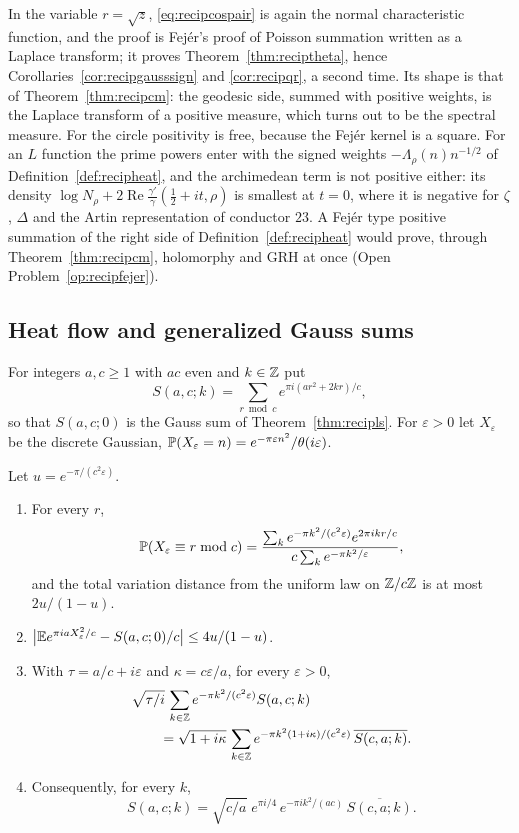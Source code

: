 In the variable $r=\sqrt z$, \eqref{eq:recipcospair} is again the normal characteristic function, and the proof is Fej\'er's proof of Poisson summation written as a Laplace transform; it proves Theorem~\ref{thm:reciptheta}, hence Corollaries~\ref{cor:recipgausssign} and \ref{cor:recipqr}, a second time. Its shape is that of Theorem~\ref{thm:recipcm}: the geodesic side, summed with positive weights, is the Laplace transform of a positive measure, which turns out to be the spectral measure. For the circle positivity is free, because the Fej\'er kernel is a square. For an $L$ function the prime powers enter with the signed weights $-\Lambda_\rho(n)n^{-1/2}$ of Definition~\ref{def:recipheat}, and the archimedean term is not positive either: its density $\log N_\rho+2\operatorname{Re}\frac{\gamma'}{\gamma}(\frac12+it,\rho)$ is smallest at $t=0$, where it is negative for $\zeta$, $\Delta$ and the Artin representation of conductor $23$. A Fej\'er type positive summation of the right side of Definition~\ref{def:recipheat} would prove, through Theorem~\ref{thm:recipcm}, holomorphy and GRH at once (Open Problem~\ref{op:recipfejer}).

\subsection{Heat flow and generalized Gauss sums}

For integers $a,c\ge1$ with $ac$ even and $k\in\mathbb{Z}$ put
\[
S(a,c;k)=\sum_{r\bmod c}e^{\pi i(ar^2+2kr)/c},
\]
so that $S(a,c;0)$ is the Gauss sum of Theorem~\ref{thm:recipls}. For $\varepsilon>0$ let $X_\varepsilon$ be the discrete Gaussian, $\mathbb{P}(X_\varepsilon=n)=e^{-\pi\varepsilon n^2}/\theta(i\varepsilon)$.

\begin{theorem}\label{thm:recipheat}
Let $u=e^{-\pi/(c^2\varepsilon)}$.
\begin{enumerate}
\item[(i)] For every $r$,
\[
\mathbb{P}(X_\varepsilon\equiv r\bmod c)=\frac{\sum_ke^{-\pi k^2/(c^2\varepsilon)}e^{2\pi ikr/c}}{c\sum_ke^{-\pi k^2/\varepsilon}},
\]
and the total variation distance from the uniform law on $\mathbb{Z}/c\mathbb{Z}$ is at most $2u/(1-u)$.
\item[(ii)] $\bigl|\mathbb{E} e^{\pi iaX_\varepsilon^2/c}-S(a,c;0)/c\bigr|\le4u/(1-u)$.
\item[(iii)] With $\tau=a/c+i\varepsilon$ and $\kappa=c\varepsilon/a$, for every $\varepsilon>0$,
\[
\begin{split}
&\sqrt{\tau/i}\,\sum_{k\in\mathbb{Z}}e^{-\pi k^2/(c^2\varepsilon)}S(a,c;k)\\
&\qquad=\sqrt{1+i\kappa}\,\sum_{k\in\mathbb{Z}}e^{-\pi k^2(1+i\kappa)/(c^2\varepsilon)}\,\overline{S(c,a;k)} .
\end{split}
\]
\item[(iv)] Consequently, for every $k$,
\[
S(a,c;k)=\sqrt{c/a}\;e^{\pi i/4}\,e^{-\pi ik^2/(ac)}\,\overline{S(c,a;k)}.
\]
\end{enumerate}
\end{theorem}

